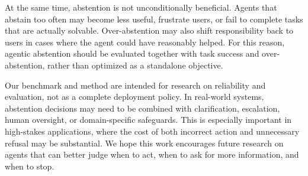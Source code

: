 \documentclass{llmxive}
\begin{document}
At the same time, abstention is not unconditionally beneficial. Agents that abstain too often may become less useful, frustrate users, or fail to complete tasks that are actually solvable. Over-abstention may also shift responsibility back to users in cases where the agent could have reasonably helped. For this reason, agentic abstention should be evaluated together with task success and over-abstention, rather than optimized as a standalone objective.

Our benchmark and method are intended for research on reliability and evaluation, not as a complete deployment policy. In real-world systems, abstention decisions may need to be combined with clarification, escalation, human oversight, or domain-specific safeguards. This is especially important in high-stakes applications, where the cost of both incorrect action and unnecessary refusal may be substantial. We hope this work encourages future research on agents that can better judge when to act, when to ask for more information, and when to stop.










\end{document}
